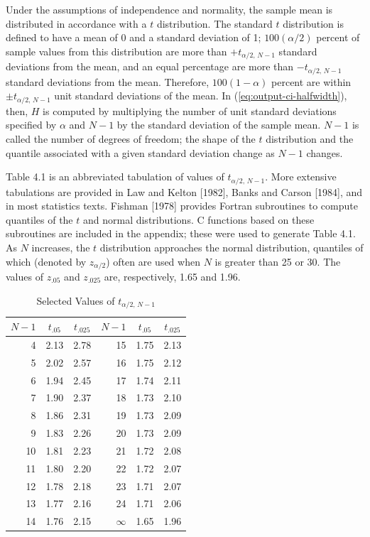 Under the assumptions of independence and normality, the sample mean is
distributed in accordance with a $t$ distribution. The standard $t$
distribution is defined to have a mean of 0 and a standard deviation of 1;
$100(\alpha/2)$ percent of sample values from this distribution are more than
$+t_{\alpha/2,\,N-1}$ standard deviations from the mean, and an equal
percentage are more than $-t_{\alpha/2,\,N-1}$ standard deviations from the
mean. Therefore, $100(1-\alpha)$ percent are within
$\pm t_{\alpha/2,\,N-1}$ unit standard deviations of the mean. In
(\ref{eq:output-ci-halfwidth}), then, $H$ is computed by multiplying the
number of unit standard deviations specified by $\alpha$ and $N-1$ by the
standard deviation of the sample mean. $N-1$ is called the number of degrees
of freedom; the shape of the $t$ distribution and the quantile associated
with a given standard deviation change as $N-1$ changes.

Table 4.1 is an abbreviated tabulation of values of $t_{\alpha/2,\,N-1}$. More
extensive tabulations are provided in Law and Kelton [1982], Banks and Carson
[1984], and in most statistics texts. Fishman [1978] provides Fortran
subroutines to compute quantiles of the $t$ and normal distributions. C
functions based on these subroutines are included in the appendix; these were
used to generate Table 4.1. As $N$ increases, the $t$ distribution approaches
the normal distribution, quantiles of which (denoted by $z_{\alpha/2}$) often
are used when $N$ is greater than 25 or 30. The values of $z_{.05}$ and
$z_{.025}$ are, respectively, 1.65 and 1.96.

\begin{table}[ht]
\centering
\begin{tabular}{rcc rcc}
\toprule
\multicolumn{1}{c}{$N-1$} & $t_{.05}$ & $t_{.025}$ &
\multicolumn{1}{c}{$N-1$} & $t_{.05}$ & $t_{.025}$ \\
\midrule
4  & 2.13 & 2.78 & 15 & 1.75 & 2.13 \\
5  & 2.02 & 2.57 & 16 & 1.75 & 2.12 \\
6  & 1.94 & 2.45 & 17 & 1.74 & 2.11 \\
7  & 1.90 & 2.37 & 18 & 1.73 & 2.10 \\
8  & 1.86 & 2.31 & 19 & 1.73 & 2.09 \\
9  & 1.83 & 2.26 & 20 & 1.73 & 2.09 \\
10 & 1.81 & 2.23 & 21 & 1.72 & 2.08 \\
11 & 1.80 & 2.20 & 22 & 1.72 & 2.07 \\
12 & 1.78 & 2.18 & 23 & 1.71 & 2.07 \\
13 & 1.77 & 2.16 & 24 & 1.71 & 2.06 \\
14 & 1.76 & 2.15 & $\infty$ & 1.65 & 1.96 \\
\bottomrule
\end{tabular}
\caption{Selected Values of $t_{\alpha/2,\,N-1}$}
\end{table}

